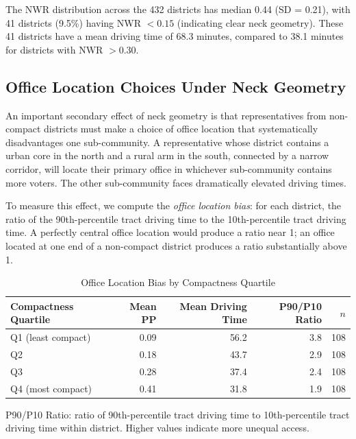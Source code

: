 The NWR distribution across the 432 districts has median 0.44 (SD = 0.21), with 41
districts (9.5\%) having NWR $< 0.15$ (indicating clear neck geometry). These
41 districts have a mean driving time of 68.3 minutes, compared to 38.1 minutes
for districts with NWR $> 0.30$.

\subsection{Office Location Choices Under Neck Geometry}

An important secondary effect of neck geometry is that representatives from non-compact
districts must make a choice of office location that systematically disadvantages one
sub-community. A representative whose district contains a urban core in the north and
a rural arm in the south, connected by a narrow corridor, will locate their primary
office in whichever sub-community contains more voters. The other sub-community faces
dramatically elevated driving times.

To measure this effect, we compute the \textit{office location bias}: for each district,
the ratio of the 90th-percentile tract driving time to the 10th-percentile tract driving
time. A perfectly central office location would produce a ratio near 1; an office
located at one end of a non-compact district produces a ratio substantially above 1.

\begin{table}[ht]
\centering
\caption{Office Location Bias by Compactness Quartile}
\label{tab:bias}
\begin{tabular}{lrrrr}
\toprule
Compactness Quartile & Mean PP & Mean Driving Time & P90/P10 Ratio & $n$ \\
\midrule
Q1 (least compact) & 0.09 & 56.2 & 3.8 & 108 \\
Q2 & 0.18 & 43.7 & 2.9 & 108 \\
Q3 & 0.28 & 37.4 & 2.4 & 108 \\
Q4 (most compact) & 0.41 & 31.8 & 1.9 & 108 \\
\bottomrule
\end{tabular}
\begin{tablenotes}
\small
\item P90/P10 Ratio: ratio of 90th-percentile tract driving time to 10th-percentile
  tract driving time within district. Higher values indicate more unequal access.
\end{tablenotes}
\end{table}

